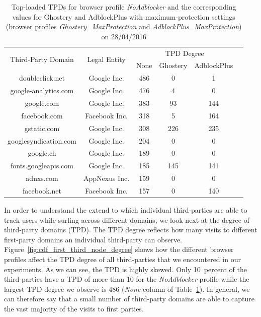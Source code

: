 \documentclass[compsoc, conference, letterpaper, 10pt, times]{IEEEtran}
\begin{document}
  \begin{table}
  \centering
  \begin{tabular}{|c|c|c|c|c|c|}
  \hline
    \multirow{2}{*}{Third-Party Domain} & \multirow{2}{*}{Legal Entity} & \multicolumn{3}{|c|}{TPD Degree} \\
  \cline{3-5}
    & & \scriptsize{None} & \scriptsize{Ghostery} & \scriptsize{AdblockPlus} \\
  \hline
  doubleclick.net & Google Inc. & 486 & 0 & 1 \\
  google-analytics.com & Google Inc. & 476 & 4 & 0 \\
  google.com & Google Inc. & 383 & 93 & 144 \\
  facebook.com & Facebook Inc. & 318 & 5 & 164 \\
  gstatic.com & Google Inc. & 308 & 226 & 235 \\
  googlesyndication.com & Google Inc. & 204 & 0 & 0 \\
  google.ch & Google Inc. & 189 & 0 & 0 \\
  fonts.googleapis.com & Google Inc. & 185 & 145 & 141 \\
  adnxs.com & AppNexus Inc. & 159 & 0 & 0 \\
  facebook.net & Facebook Inc. & 157 & 0 & 140 \\
  \hline
  \end{tabular}
  \caption{Top-loaded TPDs for browser profile \textit{NoAdblocker} and the corresponding values for Ghostery and AdblockPlus with maximum-protection settings (browser profiles \textit{Ghostery\_MaxProtection} and \textit{AdblockPlus\_MaxProtection}) on 28/04/2016}
  \label{table:top_10_third_party_domains}
  \end{table}


In order to understand the extend to which individual third-parties are able to track users while surfing across different domains, we look next at the degree of third-party domains (TPD). The TPD degree reflects how many visits to different first-party domains an individual third-party can observe.  Figure~\ref{fig:cdf_first_third_node_degree} shows how the different browser profiles affect the TPD degree of all third-parties that we encountered in our experiments. As we can see, the TPD is highly skewed. %
Only 10~percent of the third-parties have a TPD of more than 10 for the \textit{NoAdblocker} profile while the largest TPD degree we observe is 486 (\textit{None} column of Table~\ref{table:top_10_third_party_domains}).
In general, we can therefore say that a small number of third-party domains are able to capture the vast majority of the visits to first parties. 
\end{document}

